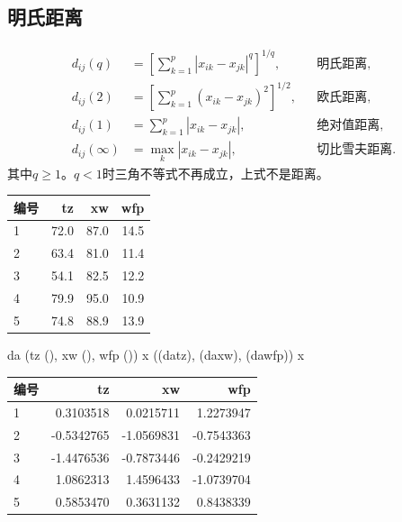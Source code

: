 \subsection{明氏距离}
\begin{align}
d_{ij}(q)&=\left[\sum_{k=1}^p|x_{ik}-x_{jk}|^q\right]^{1/q},&&\text{明氏距离},\\
d_{ij}(2)&=\left[\sum_{k=1}^p(x_{ik}-x_{jk})^2\right]^{1/2},&&\text{欧氏距离},\\
d_{ij}(1)&=\sum_{k=1}^p|x_{ik}-x_{jk}|,&&\text{绝对值距离},\\
d_{ij}(\infty)&=\max_k|x_{ik}-x_{jk}|,&&\text{切比雪夫距离}.
\end{align}
其中$q\geqslant1$。$q<1$时三角不等式不再成立，上式不是距离。
\par\addvspace{5pt}\begin{center}\begin{minipage}{\linewidth}\centering
\small
{}
\begin{tabular}{lrrr}\toprule
{\bfseries 编号 }&{\bfseries  tz }&{\bfseries  xw }&{\bfseries  wfp}\\\midrule
1 & 72.0 & 87.0 & 14.5\\
2 & 63.4 & 81.0 & 11.4\\
3 & 54.1 & 82.5 & 12.2\\
4 & 79.9 & 95.0 & 10.9\\
5 & 74.8 & 88.9 & 13.9\\
\bottomrule\end{tabular}
\end{minipage}\end{center}

\begin{code}
da \ROperator{<-} (tz \ROperator{=} (),
                 xw \ROperator{=} (),
                 wfp \ROperator{=} ())
x \ROperator{<-} ((da\ROperator{\$}tz), (da\ROperator{\$}xw), (da\ROperator{\$}wfp))
x
\end{code}
\par\addvspace{5pt}\begin{center}\begin{minipage}{\linewidth}\centering
\small
{}
\begin{tabular}{lrrr}\toprule
{\bfseries 编号 }&{\bfseries  tz }&{\bfseries  xw }&{\bfseries  wfp}\\\midrule
1 & 0.3103518 & 0.0215711 & 1.2273947\\
2 & -0.5342765 & -1.0569831 & -0.7543363\\
3 & -1.4476536 & -0.7873446 & -0.2429219\\
4 & 1.0862313 & 1.4596433 & -1.0739704\\
5 & 0.5853470 & 0.3631132 & 0.8438339\\
\bottomrule\end{tabular}
\end{minipage}\end{center}


